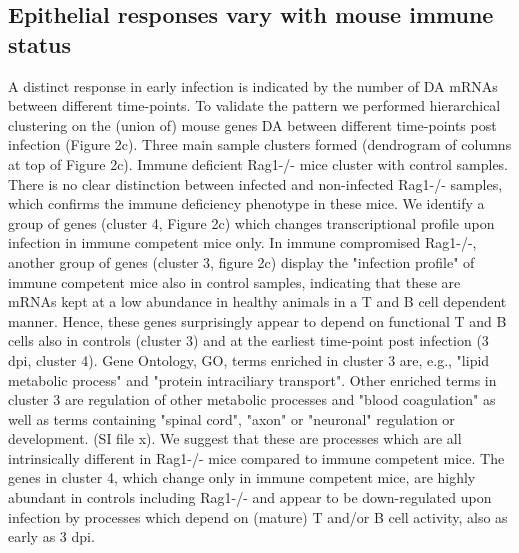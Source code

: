 \documentclass{bmcart}
\begin{document}
\subsection*{Epithelial responses vary with mouse immune status}
A distinct response in early infection is indicated by the number of DA mRNAs between different time-points. To validate the pattern we performed hierarchical clustering on the (union of) mouse genes DA between different time-points post infection (Figure 2c). Three main sample clusters formed (dendrogram of columns at top of Figure 2c). Immune deficient Rag1-/- mice cluster with control samples. There is no clear distinction between infected and non-infected Rag1-/- samples, which confirms the immune deficiency phenotype in these mice. 
We identify a group of genes (cluster 4, Figure 2c) which changes transcriptional profile upon infection  in immune competent mice only. In immune compromised Rag1-/-, another group of genes (cluster 3, figure 2c) display the "infection profile" of immune competent mice also in control samples, indicating that these are mRNAs kept at a low abundance in healthy animals in a T and B cell dependent manner. Hence, these genes surprisingly appear to depend on functional T and B cells also in controls (cluster 3) and at the earliest time-point post infection (3 dpi, cluster 4). 
Gene Ontology, GO, terms enriched in cluster 3 are, e.g., "lipid metabolic process" and "protein intraciliary transport". Other enriched terms in cluster 3 are regulation of other metabolic processes and "blood coagulation" as well as terms containing "spinal cord", "axon" or "neuronal" regulation or development. (SI file x). We suggest that these are processes which are all intrinsically different in Rag1-/- mice compared to immune competent mice. The genes in cluster 4, which change only in immune competent mice, are highly abundant in controls including Rag1-/- and appear to be down-regulated upon infection by processes which depend on (mature) T and/or B cell activity, also as early as 3 dpi. 
\end{document}

